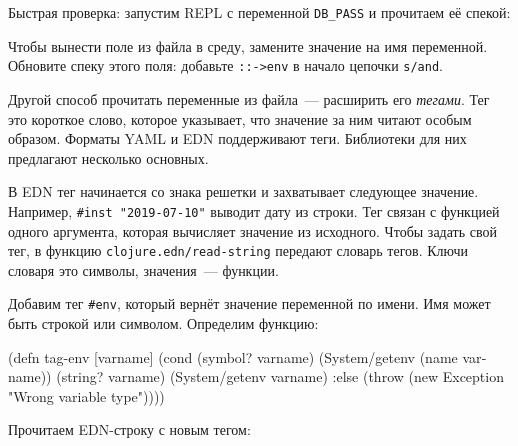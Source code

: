 Быстрая проверка: запустим REPL с переменной \verb|DB_PASS| и прочитаем её
спекой:

\begin{english}
  \begin{bash}
DB_PASS='*(&fd}A53z#$!' lein repl

(s/conform ::db-password "DB_PASS")
"*(&fd}A53z#$!"
  \end{bash}
\end{english}

Чтобы вынести поле из файла в среду, замените значение на имя
переменной. Обновите спеку этого поля: добавьте \verb|::->env| в начало
цепочки \verb|s/and|.


Другой способ прочитать переменные из файла~--- расширить его \emph{тегами}. Тег
это короткое слово, которое указывает, что значение за ним читают особым
образом. Форматы YAML и EDN поддерживают теги. Библиотеки для них предлагают
несколько основных.


В EDN тег начинается со знака решетки и захватывает следующее
значение. Например, \verb|#inst "2019-07-10"| выводит дату из строки. Тег
связан с функцией одного аргумента, которая вычисляет значение из
исходного. Чтобы задать свой тег, в функцию \verb|clojure.edn/read-string|
передают словарь тегов. Ключи словаря это символы, значения~--- функции.

Добавим тег \verb|#env|, который вернёт значение переменной по имени. Имя
может быть строкой или символом. Определим функцию:

\begin{english}
  \begin{clojure}
(defn tag-env
  [varname]
  (cond
    (symbol? varname)
    (System/getenv (name varname))
    (string? varname)
    (System/getenv varname)
    :else
    (throw (new Exception "Wrong variable type"))))
  \end{clojure}
\end{english}

\noindent
Прочитаем EDN-строку с новым тегом:

\begin{english}
  \begin{clojure}
(require '[clojure.edn :as edn])

(edn/read-string
 {:readers {'env tag-env}}
 "{:db-password #env DB_PASS}")

;; {:db-password "*(&fd}A53z#$!"}
  \end{clojure}
\end{english}

